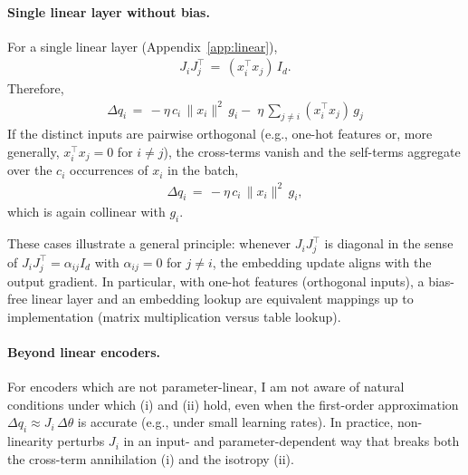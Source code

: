 \paragraph{Single linear layer without bias.}
For a single linear layer (Appendix~\ref{app:linear}),
\begin{align}
J_{i}J_{j}^{\!\top} \,=\, (x_i^{\!\top} x_j)\, I_d. \label{eq:JJ-linear}
\end{align}
Therefore,
\begin{align}
\Delta q_i \,=\, -\eta\,c_i\,\|x_i\|^2\,g_i -\; \eta\,\sum_{j\neq i}(x_i^{\!\top}x_j)\,g_j
\end{align}
If the distinct inputs are pairwise orthogonal (e.g., one-hot features or, more generally, $x_i^{\!\top}x_j=0$ for $i\neq j$), the cross-terms vanish and the self-terms aggregate over the $c_i$ occurrences of $x_i$ in the batch,
\begin{align}
\Delta q_i \,=\, -\eta\,c_i\,\|x_i\|^2\,g_i,
\end{align}
which is again collinear with $g_i$.

These cases illustrate a general principle: whenever $J_{i}J_{j}^{\!\top}$ is diagonal in the sense of \(J_{i}J_{j}^{\!\top} = \alpha_{ij} I_d\) with $\alpha_{ij}=0$ for $j\neq i$, the embedding update aligns with the output gradient. In particular, with one-hot features (orthogonal inputs), a bias-free linear layer and an embedding lookup are equivalent mappings up to implementation (matrix multiplication versus table lookup).

\paragraph{Beyond linear encoders.}\label{sec:beyond-linear}
For encoders which are not parameter-linear, I am not aware of natural conditions under which (i) and (ii) hold, even when the first-order approximation $\Delta q_i \approx J_i\,\Delta\theta$ is accurate (e.g., under small learning rates). In practice, non-linearity perturbs $J_i$ in an input- and parameter-dependent way that breaks both the cross-term annihilation (i) and the isotropy (ii).

